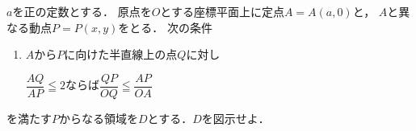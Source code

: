 \documentclass[../../main.tex]{subfiles}
\begin{document}
$a$を正の定数とする．
原点を$O$とする座標平面上に定点$A=A(a,0)$と，
$A$と異なる動点$P=P(x,y)$をとる．
次の条件
\begin{enumerate}
  \item [　]$A$から$P$に向けた半直線上の点$Q$に対し

    $\displaystyle\dfrac{AQ}{AP}\leqq2$ならば$\displaystyle\dfrac{QP}{OQ}\leqq\dfrac{AP}{OA}$
\end{enumerate}
を満たす$P$からなる領域を$D$とする．$D$を図示せよ．
\end{document}
